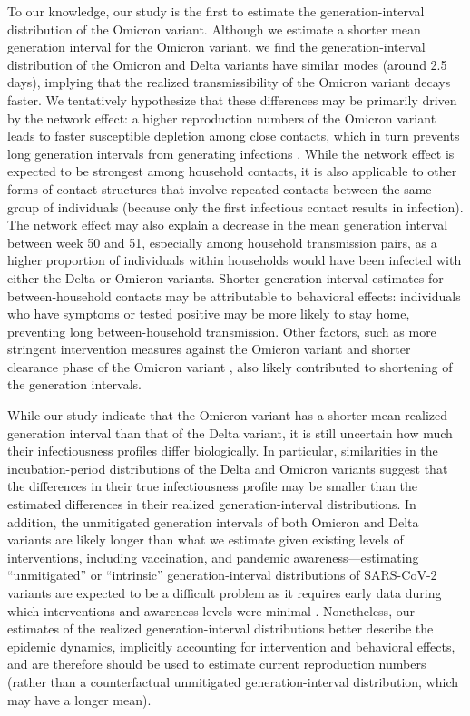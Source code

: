 \documentclass[12pt]{article}
\begin{document}
To our knowledge, our study is the first to estimate the generation-interval distribution of the Omicron variant.
Although we estimate a shorter mean generation interval for the Omicron variant, we find the generation-interval distribution of the Omicron and Delta variants have similar modes (around 2.5 days), implying that the realized transmissibility of the Omicron variant decays faster.
We tentatively hypothesize that these differences may be primarily driven by the network effect: a higher reproduction numbers of the Omicron variant leads to faster susceptible depletion among close contacts, which in turn prevents long generation intervals from generating infections \citep{park2020inferring,hart2022generation}. 
While the network effect is expected to be strongest among household contacts, it is also applicable to other forms of contact structures that involve repeated contacts between the same group of individuals (because only the first infectious contact results in infection).
The network effect may also explain a decrease in the mean generation interval between week 50 and 51, especially among household transmission pairs, as a higher proportion of individuals within households would have been infected with either the Delta or Omicron variants.
Shorter generation-interval estimates for between-household contacts may be attributable to behavioral effects: individuals who have symptoms or tested positive may be more likely to stay home, preventing long between-household transmission.
Other factors, such as more stringent intervention measures against the Omicron variant \citep{backer2021omicron} and shorter clearance phase of the Omicron variant \citep{hay2022viral}, also likely contributed to shortening of the generation intervals.

While our study indicate that the Omicron variant has a shorter mean realized generation interval than that of the Delta variant, it is still uncertain how much their infectiousness profiles differ biologically.
In particular, similarities in the incubation-period distributions of the Delta and Omicron variants suggest that the differences in their true infectiousness profile may be smaller than the estimated differences in their realized generation-interval distributions.
In addition, the unmitigated generation intervals of both Omicron and Delta variants are likely longer than what we estimate given existing levels of interventions, including vaccination, and pandemic awareness---estimating ``unmitigated'' or ``intrinsic'' generation-interval distributions of SARS-CoV-2 variants are expected to be a difficult problem as it requires early data during which interventions and awareness levels were minimal \citep{sender2021unmitigated}.
Nonetheless, our estimates of the realized generation-interval distributions better describe the epidemic dynamics, implicitly accounting for intervention and behavioral effects, and are therefore should be used to estimate current reproduction numbers (rather than a counterfactual unmitigated generation-interval distribution, which may have a longer mean).
\end{document}
